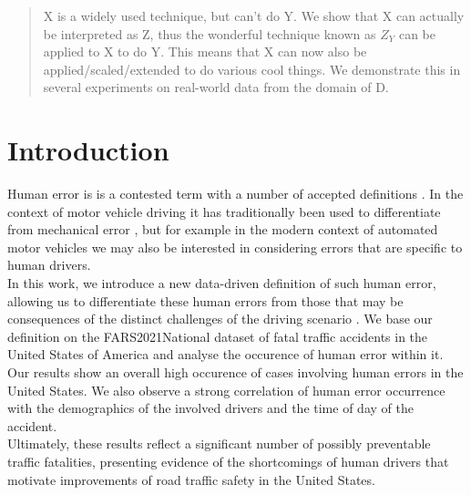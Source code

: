 \documentclass{article}
\theoremstyle{plain}
\theoremstyle{definition}
\theoremstyle{remark}
\begin{document}
\printAffiliationsAndNotice{\icmlEqualContribution} %


\begin{abstract}

X is a widely used technique, but can’t do Y. We show that X can actually be interpreted as Z, thus the wonderful technique known as $Z_Y$ can be applied to X to do Y. This means that X can now also be applied/scaled/extended to do various cool things. We demonstrate this in several experiments on real-world data from the domain of D.
\end{abstract}


\section{Introduction}\label{sec:intro}



Human error is is a contested term with a number of accepted definitions \citep{reason2000human, woods2017behind, strauch2017investigating}. In the context of motor vehicle driving it has traditionally been used to differentiate from mechanical error \citep{stanton2009human}, but for example in the modern context of automated motor vehicles we may also be interested in considering errors that are specific to human drivers.
\\
In this work, we introduce a new data-driven definition of such human error, allowing us to differentiate these human errors from those that may be consequences of the distinct challenges of the driving scenario \citep{guanetti2018control}. We base our definition on the FARS2021National dataset \citep{fars} of fatal traffic accidents in the United States of America and analyse the occurence of human error within it. 
\\
Our results show an overall high occurence of cases involving human errors in the United States. We also observe a strong correlation of human error occurrence with the demographics of the involved drivers and the time of day of the accident.
\\
Ultimately, these results reflect a significant number of possibly preventable traffic fatalities, presenting evidence of the shortcomings of human drivers that motivate improvements of road traffic safety in the United States.
\end{document}
